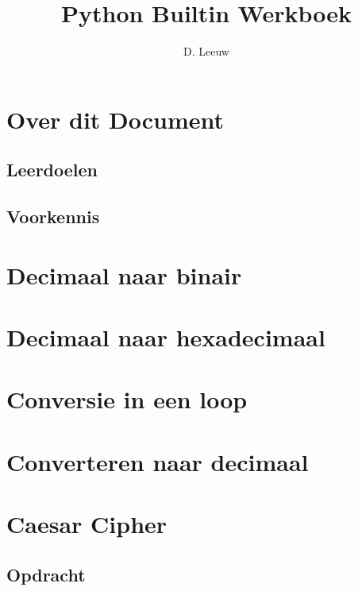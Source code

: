 \documentclass[a4paper,12pt,twoside,openright,titlepage]{article}
\author{D. Leeuw}
\title{Python Builtin Werkboek}
\date{\today\\
1.0.0 \\
\vfill
\raggedright
\copyright\ 2025 Dennis Leeuw\\
}
\begin{document}

\maketitle


\section{Over dit Document}
\subsection{Leerdoelen}

\subsection{Voorkennis}




\section{Decimaal naar binair}


\section{Decimaal naar hexadecimaal}


\section{Conversie in een loop}


\section{Converteren naar decimaal}


\section{Caesar Cipher}


\subsection{Opdracht}

\end{document}
